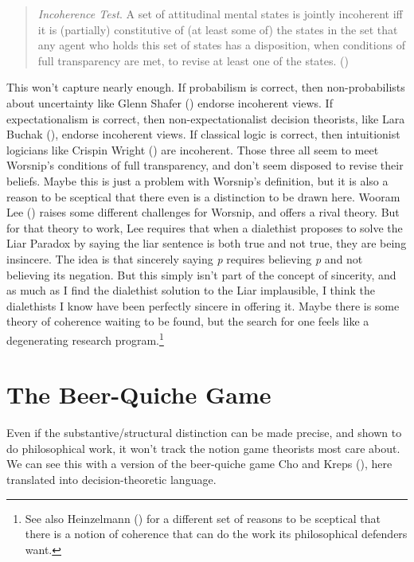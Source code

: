 \documentclass[
  12pt,
  letterpaper,
  DIV=11,
  numbers=noendperiod]{scrreprt}
\begin{document}
\begin{quote}
\emph{Incoherence Test}. A set of attitudinal mental states is jointly
incoherent iff it is (partially) constitutive of (at least some of) the
states in the set that any agent who holds this set of states has a
disposition, when conditions of full transparency are met, to revise at
least one of the states. ()
\end{quote}

This won't capture nearly enough. If probabilism is correct, then
non-probabilists about uncertainty like Glenn Shafer
() endorse incoherent views. If
expectationalism is correct, then non-expectationalist decision
theorists, like Lara Buchak (), endorse
incoherent views. If classical logic is correct, then intuitionist
logicians like Crispin Wright
() are incoherent. Those
three all seem to meet Worsnip's conditions of full transparency, and
don't seem disposed to revise their beliefs. Maybe this is just a
problem with Worsnip's definition, but it is also a reason to be
sceptical that there even is a distinction to be drawn here. Wooram Lee
() raises some different challenges for
Worsnip, and offers a rival theory. But for that theory to work, Lee
requires that when a dialethist proposes to solve the Liar Paradox by
saying the liar sentence is both true and not true, they are being
insincere. The idea is that sincerely saying \emph{p} requires believing
\emph{p} and not believing its negation. But this simply isn't part of
the concept of sincerity, and as much as I find the dialethist solution
to the Liar implausible, I think the dialethists I know have been
perfectly sincere in offering it. Maybe there is some theory of
coherence waiting to be found, but the search for one feels like a
degenerating research program.\footnote{See also Heinzelmann
  () for a different set of reasons to
  be sceptical that there is a notion of coherence that can do the work
  its philosophical defenders want.}

\section{The Beer-Quiche Game}\label{sec-beer-quiche}

Even if the substantive/structural distinction can be made precise, and
shown to do philosophical work, it won't track the notion game theorists
most care about. We can see this with a version of the beer-quiche game
Cho and Kreps (), here translated into
decision-theoretic language.
\end{document}

